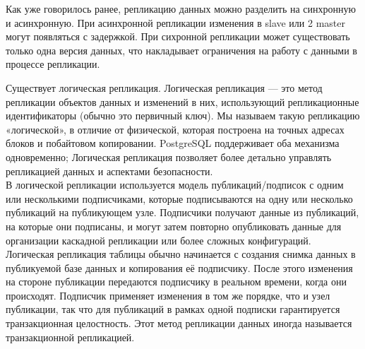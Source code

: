 \begin{enumerate}
    Как уже говорилось ранее, репликацию данных можно разделить на синхронную и асинхронную. При асинхронной репликации изменения в slave или 2 master могут появляться с задержкой. При сихронной репликации может существовать только одна версия данных, что накладывает ограничения на работу с данными в процессе репликации.
        
    Существует логическая репликация. Логическая репликация — это метод репликации объектов данных и изменений в них, использующий репликационные идентификаторы (обычно это первичный ключ). Мы называем такую репликацию «логической», в отличие от физической, которая построена на точных адресах блоков и побайтовом копировании. PostgreSQL поддерживает оба механизма одновременно; Логическая репликация позволяет более детально управлять репликацией данных и аспектами безопасности. \\

    В логической репликации используется модель публикаций/подписок с одним или несколькими подписчиками, которые подписываются на одну или несколько публикаций на публикующем узле. Подписчики получают данные из публикаций, на которые они подписаны, и могут затем повторно опубликовать данные для организации каскадной репликации или более сложных конфигураций. \\

    Логическая репликация таблицы обычно начинается с создания снимка данных в публикуемой базе данных и копирования её подписчику. После этого изменения на стороне публикации передаются подписчику в реальном времени, когда они происходят. Подписчик применяет изменения в том же порядке, что и узел публикации, так что для публикаций в рамках одной подписки гарантируется транзакционная целостность. Этот метод репликации данных иногда называется транзакционной репликацией.
    

\end{enumerate}
